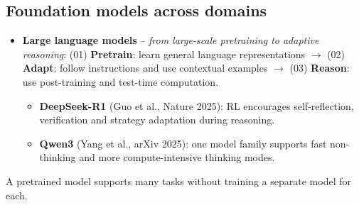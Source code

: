 \subsection{Foundation models across domains}\label{sec:lec15-domains}

\begin{itemize}
  \item \textbf{Large language models} -- \emph{from large-scale pretraining to adaptive
    reasoning}: (01) \textbf{Pretrain}: learn general language representations $\to$
    (02) \textbf{Adapt}: follow instructions and use contextual examples $\to$ (03)
    \textbf{Reason}: use post-training and test-time computation.
    \begin{itemize}
      \item \textbf{DeepSeek-R1} (Guo et al., Nature 2025): RL encourages
        self-reflection, verification and strategy adaptation during reasoning.
      \item \textbf{Qwen3} (Yang et al., arXiv 2025): one model family supports fast
        non-thinking and more compute-intensive thinking modes.
    \end{itemize}
\end{itemize}
\begin{keyidea}[slide 4]
  A pretrained model supports many tasks without training a separate model for each.
\end{keyidea}
